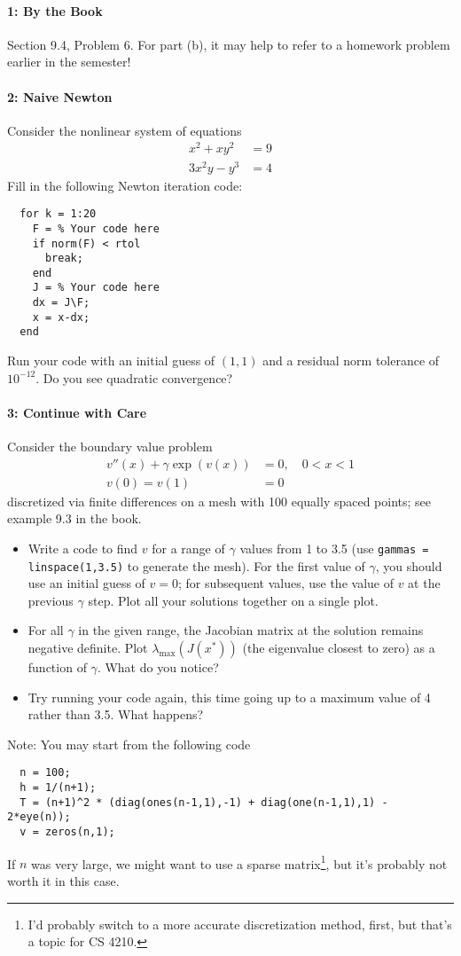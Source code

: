 \documentclass[12pt, leqno]{article}
\begin{document}

\paragraph*{1: By the Book}
Section 9.4, Problem 6.  For part (b), it may help to refer to
a homework problem earlier in the semester!

\paragraph*{2: Naive Newton}
Consider the nonlinear system of equations
\begin{align*}
  x^2 + xy^2 &= 9 \\
  3x^2y - y^3 &= 4
\end{align*}
Fill in the following Newton iteration code:
\begin{lstlisting}
  for k = 1:20
    F = % Your code here
    if norm(F) < rtol
      break;
    end
    J = % Your code here
    dx = J\F;
    x = x-dx;
  end
\end{lstlisting}
Run your code with an initial guess of $(1,1)$ and a residual norm
tolerance of $10^{-12}$.  Do you see quadratic convergence?

\paragraph*{3: Continue with Care}
Consider the boundary value problem
\begin{align*}
  v''(x) + \gamma \exp(v(x)) &= 0, \quad 0 < x < 1 \\
  v(0) = v(1) &= 0
\end{align*}
discretized via finite differences on a mesh with 100 equally spaced
points; see example 9.3 in the book.
\begin{itemize}
\item
  Write a code to find $v$ for
  a range of $\gamma$ values from 1 to 3.5 (use
  {\tt gammas = linspace(1,3.5)} to generate the mesh).  For the first
  value of $\gamma$, you should use an initial guess of $v = 0$;
  for subsequent values, use the value of $v$ at the previous
  $\gamma$ step.  Plot all your solutions together on a single plot.
\item
  For all $\gamma$ in the given range, the Jacobian matrix at the
  solution remains negative definite.  Plot
  $\lambda_{\max}(J(x^*))$ (the eigenvalue closest to zero) as a
  function of $\gamma$.  What do you notice?
\item
  Try running your code again, this time going up to a maximum value
  of 4 rather than 3.5.  What happens?
\end{itemize}
Note: You may start from the following code
\begin{lstlisting}
  n = 100;
  h = 1/(n+1);
  T = (n+1)^2 * (diag(ones(n-1,1),-1) + diag(one(n-1,1),1) - 2*eye(n));
  v = zeros(n,1);
\end{lstlisting}
If $n$ was very large, we might want to use a sparse matrix\footnote{%
I'd probably switch to a more accurate discretization method, first,
but that's a topic for CS 4210.
}, but it's probably not worth it in this case.
\end{document}
